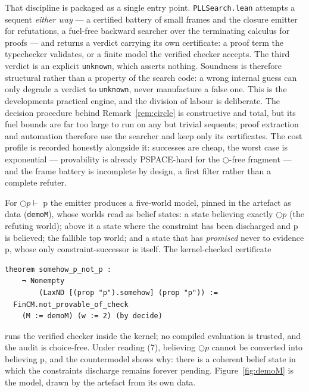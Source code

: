 That discipline is packaged as a single entry point.
\texttt{PLLSearch.lean} attempts a sequent \emph{either way} --- a
certified battery of small frames and the closure emitter for
refutations, a fuel-free backward searcher over the terminating calculus
for proofs --- and returns a verdict carrying its own certificate: a
proof term the typechecker validates, or a finite model the verified
checker accepts. The third verdict is an explicit \texttt{unknown},
which asserts nothing. Soundness is therefore structural rather than a
property of the search code: a wrong internal guess can only degrade a
verdict to \texttt{unknown}, never manufacture a false one. This is the
development\textquotesingle s practical engine, and the division of
labour is deliberate. The decision procedure behind
Remark~\ref{rem:circle} is constructive and total, but its fuel bounds
are far too large to run on any but trivial sequents; proof extraction
and automation therefore use the searcher and keep only its
certificates. The cost profile is recorded honestly alongside it:
successes are cheap, the worst case is exponential --- provability is
already PSPACE-hard for the \ensuremath{\bigcirc}-free fragment --- and
the frame battery is incomplete by design, a first filter rather than a
complete refuter.

For \ensuremath{\bigcirc p \vdash} p the emitter produces a five-world model, pinned in the
artefact as data (\texttt{demoM}), whose worlds read as belief states: a state
believing exactly \ensuremath{\bigcirc p} (the refuting world); above it a state where the
constraint has been discharged and p is believed; the fallible top world;
and a state that has \emph{promised} never to
evidence p, whose only constraint-successor is itself. The
kernel-checked certificate

\begin{lstlisting}
theorem somehow_p_not_p :
    ¬ Nonempty
        (LaxND [(prop "p").somehow] (prop "p")) :=
  FinCM.not_provable_of_check
    (M := demoM) (w := 2) (by decide)
\end{lstlisting}

runs the verified checker inside the kernel; no compiled evaluation is
trusted, and the audit is choice-free. Under reading (7), believing \ensuremath{\bigcirc p}
cannot be converted into believing p, and the countermodel shows why: there
is a coherent belief state in which the constraint\textquotesingle s discharge
remains forever pending. Figure~\ref{fig:demoM} is the model, drawn
by the artefact from its own data.

